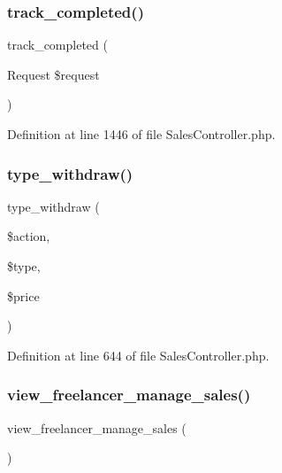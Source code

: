 \subsubsection{\texorpdfstring{track\_completed()}{track\_completed()}}
{\footnotesize\ttfamily track\+\_\+completed (\begin{DoxyParamCaption}\item[{Request}]{\$request }\end{DoxyParamCaption})\hspace{0.3cm}{\ttfamily [protected]}}



Definition at line 1446 of file Sales\+Controller.\+php.

\mbox{\label{class_responsive_1_1_http_1_1_controllers_1_1_sales_controller_a312ebafadbee3f2196f02445219f3c66}} 
\subsubsection{\texorpdfstring{type\_withdraw()}{type\_withdraw()}}
{\footnotesize\ttfamily type\+\_\+withdraw (\begin{DoxyParamCaption}\item[{}]{\$action,  }\item[{}]{\$type,  }\item[{}]{\$price }\end{DoxyParamCaption})}



Definition at line 644 of file Sales\+Controller.\+php.

\mbox{\label{class_responsive_1_1_http_1_1_controllers_1_1_sales_controller_a06fea9782c9683f602d3e9b2711b0b9a}} 
\subsubsection{\texorpdfstring{view\_freelancer\_manage\_sales()}{view\_freelancer\_manage\_sales()}}
{\footnotesize\ttfamily view\+\_\+freelancer\+\_\+manage\+\_\+sales (\begin{DoxyParamCaption}{ }\end{DoxyParamCaption})}



